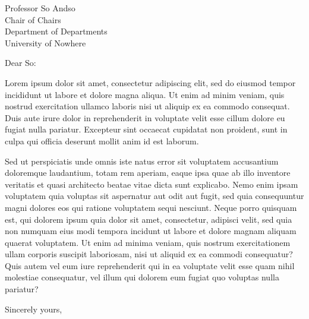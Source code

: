 \documentclass[letterpaper]{mscsletter}
\begin{document}
\begin{letter}{
Professor So Andso\\
Chair of Chairs\\
Department of Departments\\
University of Nowhere\\
}

\opening{Dear So:}

Lorem ipsum dolor sit amet, consectetur adipiscing elit, sed do
eiusmod tempor incididunt ut labore et dolore magna aliqua. Ut enim ad
minim veniam, quis nostrud exercitation ullamco laboris nisi ut
aliquip ex ea commodo consequat. Duis aute irure dolor in
reprehenderit in voluptate velit esse cillum dolore eu fugiat nulla
pariatur. Excepteur sint occaecat cupidatat non proident, sunt in
culpa qui officia deserunt mollit anim id est laborum.

Sed ut perspiciatis unde omnis iste natus error sit voluptatem
accusantium doloremque laudantium, totam rem aperiam, eaque ipsa quae
ab illo inventore veritatis et quasi architecto beatae vitae dicta
sunt explicabo. Nemo enim ipsam voluptatem quia voluptas sit
aspernatur aut odit aut fugit, sed quia consequuntur magni dolores eos
qui ratione voluptatem sequi nesciunt. Neque porro quisquam est, qui
dolorem ipsum quia dolor sit amet, consectetur, adipisci velit, sed
quia non numquam eius modi tempora incidunt ut labore et dolore magnam
aliquam quaerat voluptatem. Ut enim ad minima veniam, quis nostrum
exercitationem ullam corporis suscipit laboriosam, nisi ut aliquid ex
ea commodi consequatur? Quis autem vel eum iure reprehenderit qui in
ea voluptate velit esse quam nihil molestiae consequatur, vel illum
qui dolorem eum fugiat quo voluptas nulla pariatur?

\closing{Sincerely yours,}

\end{letter}
\end{document}
